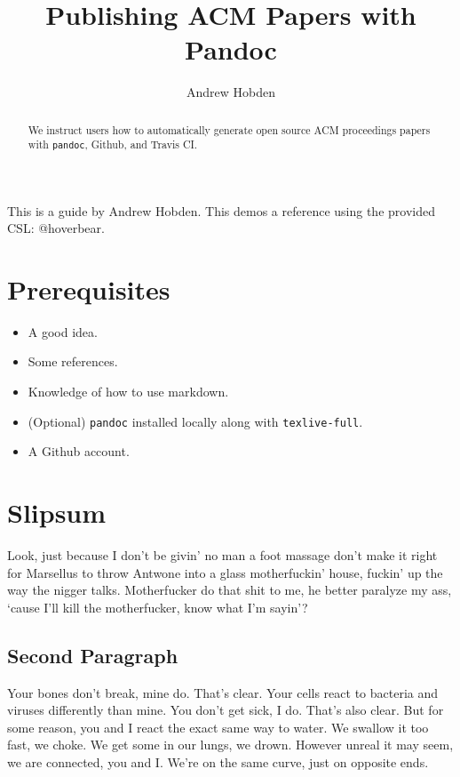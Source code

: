 \documentclass[]{templates/sig-alternate-2}
\title{Publishing ACM Papers with Pandoc}
\author{Andrew Hobden}
\date{}
\providecommand{\tightlist}{%
  \setlength{\itemsep}{0pt}\setlength{\parskip}{0pt}}
\begin{document}
\maketitle
\begin{abstract}
We instruct users how to automatically generate open source ACM proceedings papers with \texttt{pandoc}, Github, and Travis CI.
\end{abstract}

This is a guide by Andrew Hobden. This demos a reference using the provided CSL: @hoverbear.

\section{Prerequisites}\label{prerequisites}

\begin{itemize}
\tightlist
\item
  A good idea.
\item
  Some references.
\item
  Knowledge of how to use markdown.
\item
  (Optional) \texttt{pandoc} installed locally along with \texttt{texlive-full}.
\item
  A Github account.
\end{itemize}

\section{Slipsum}\label{slipsum}

Look, just because I don't be givin' no man a foot massage don't make it right for Marsellus to throw Antwone into a glass motherfuckin' house, fuckin' up the way the nigger talks. Motherfucker do that shit to me, he better paralyze my ass, `cause I'll kill the motherfucker, know what I'm sayin'?

\subsection{Second Paragraph}\label{second-paragraph}

Your bones don't break, mine do. That's clear. Your cells react to bacteria and viruses differently than mine. You don't get sick, I do. That's also clear. But for some reason, you and I react the exact same way to water. We swallow it too fast, we choke. We get some in our lungs, we drown. However unreal it may seem, we are connected, you and I. We're on the same curve, just on opposite ends.
\end{document}

